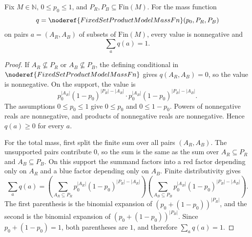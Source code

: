 \begin{helper}
Fix \(M\in\mathbb N\), \(0\le p_0\le1\), and
\(P_R,P_B\subseteq\mathrm{Fin}(M)\).  For the mass function
\[
q=\noderef{FixedSetProductModelMassFn}(p_0,P_R,P_B)
\]
on pairs \(a=(A_R,A_B)\) of subsets of \(\mathrm{Fin}(M)\), every value is
nonnegative and
\[
\sum_a q(a)=1.
\]
\end{helper}
\begin{proof}
If \(A_R\not\subseteq P_R\) or \(A_B\not\subseteq P_B\), the defining
conditional in \(\noderef{FixedSetProductModelMassFn}\) gives \(q(A_R,A_B)=0\),
so the value is nonnegative.  On the support, the value is
\[
p_0^{|A_R|}(1-p_0)^{|P_R|-|A_R|}
\cdot
p_0^{|A_B|}(1-p_0)^{|P_B|-|A_B|}.
\]
The assumptions \(0\le p_0\le1\) give \(0\le p_0\) and
\(0\le1-p_0\).  Powers of nonnegative reals are nonnegative, and products of
nonnegative reals are nonnegative.  Hence \(q(a)\ge0\) for every \(a\).

For the total mass, first split the finite sum over all pairs
\((A_R,A_B)\).  The unsupported pairs contribute \(0\), so the sum is the same
as the sum over \(A_R\subseteq P_R\) and \(A_B\subseteq P_B\).  On this support
the summand factors into a red factor depending only on \(A_R\) and a blue
factor depending only on \(A_B\).  Finite distributivity gives
\[
\sum_a q(a)=
\left(\sum_{A_R\subseteq P_R}
  p_0^{|A_R|}(1-p_0)^{|P_R|-|A_R|}\right)
\left(\sum_{A_B\subseteq P_B}
  p_0^{|A_B|}(1-p_0)^{|P_B|-|A_B|}\right).
\]
The first parenthesis is the binomial expansion of
\((p_0+(1-p_0))^{|P_R|}\), and the second is the binomial expansion of
\((p_0+(1-p_0))^{|P_B|}\).  Since \(p_0+(1-p_0)=1\), both parentheses are
\(1\), and therefore \(\sum_aq(a)=1\).
\end{proof}
